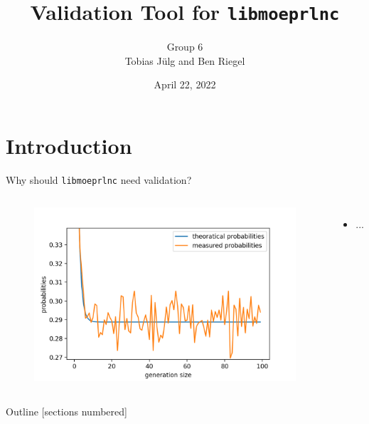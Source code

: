 \documentclass[t]{beamer} %
\title{Validation Tool for \texttt{libmoeprlnc}}
\date{April 22, 2022}
\author{Group 6\\Tobias Jülg and Ben Riegel}
\institute[TUM]{Technical University of Munich}
\begin{document}
\maketitle


\section{Introduction}
\begin{frame}{Why should \texttt{libmoeprlnc} need validation?}
	\begin{columns}
		\begin{figure}[htb]
			\centering
			\includegraphics[scale=0.16]{figures/gf2}
		\end{figure}
		\begin{itemize}
			\item ...
		\end{itemize}
	\end{columns}
\end{frame}

\begin{frame}{Outline}
	[sections numbered]
	\tableofcontents %
\end{frame}


\end{document}

